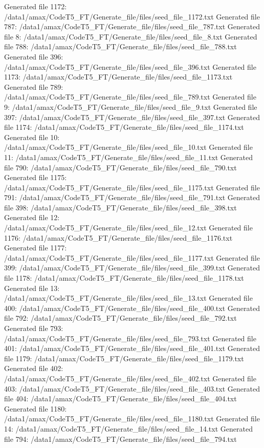 Generated file 1172: /data1/amax/CodeT5_FT/Generate_file/files/seed_file_1172.txt
Generated file 787: /data1/amax/CodeT5_FT/Generate_file/files/seed_file_787.txt
Generated file 8: /data1/amax/CodeT5_FT/Generate_file/files/seed_file_8.txt
Generated file 788: /data1/amax/CodeT5_FT/Generate_file/files/seed_file_788.txt
Generated file 396: /data1/amax/CodeT5_FT/Generate_file/files/seed_file_396.txt
Generated file 1173: /data1/amax/CodeT5_FT/Generate_file/files/seed_file_1173.txt
Generated file 789: /data1/amax/CodeT5_FT/Generate_file/files/seed_file_789.txt
Generated file 9: /data1/amax/CodeT5_FT/Generate_file/files/seed_file_9.txt
Generated file 397: /data1/amax/CodeT5_FT/Generate_file/files/seed_file_397.txt
Generated file 1174: /data1/amax/CodeT5_FT/Generate_file/files/seed_file_1174.txt
Generated file 10: /data1/amax/CodeT5_FT/Generate_file/files/seed_file_10.txt
Generated file 11: /data1/amax/CodeT5_FT/Generate_file/files/seed_file_11.txt
Generated file 790: /data1/amax/CodeT5_FT/Generate_file/files/seed_file_790.txt
Generated file 1175: /data1/amax/CodeT5_FT/Generate_file/files/seed_file_1175.txt
Generated file 791: /data1/amax/CodeT5_FT/Generate_file/files/seed_file_791.txt
Generated file 398: /data1/amax/CodeT5_FT/Generate_file/files/seed_file_398.txt
Generated file 12: /data1/amax/CodeT5_FT/Generate_file/files/seed_file_12.txt
Generated file 1176: /data1/amax/CodeT5_FT/Generate_file/files/seed_file_1176.txt
Generated file 1177: /data1/amax/CodeT5_FT/Generate_file/files/seed_file_1177.txt
Generated file 399: /data1/amax/CodeT5_FT/Generate_file/files/seed_file_399.txt
Generated file 1178: /data1/amax/CodeT5_FT/Generate_file/files/seed_file_1178.txt
Generated file 13: /data1/amax/CodeT5_FT/Generate_file/files/seed_file_13.txt
Generated file 400: /data1/amax/CodeT5_FT/Generate_file/files/seed_file_400.txt
Generated file 792: /data1/amax/CodeT5_FT/Generate_file/files/seed_file_792.txt
Generated file 793: /data1/amax/CodeT5_FT/Generate_file/files/seed_file_793.txt
Generated file 401: /data1/amax/CodeT5_FT/Generate_file/files/seed_file_401.txt
Generated file 1179: /data1/amax/CodeT5_FT/Generate_file/files/seed_file_1179.txt
Generated file 402: /data1/amax/CodeT5_FT/Generate_file/files/seed_file_402.txt
Generated file 403: /data1/amax/CodeT5_FT/Generate_file/files/seed_file_403.txt
Generated file 404: /data1/amax/CodeT5_FT/Generate_file/files/seed_file_404.txt
Generated file 1180: /data1/amax/CodeT5_FT/Generate_file/files/seed_file_1180.txt
Generated file 14: /data1/amax/CodeT5_FT/Generate_file/files/seed_file_14.txt
Generated file 794: /data1/amax/CodeT5_FT/Generate_file/files/seed_file_794.txt
